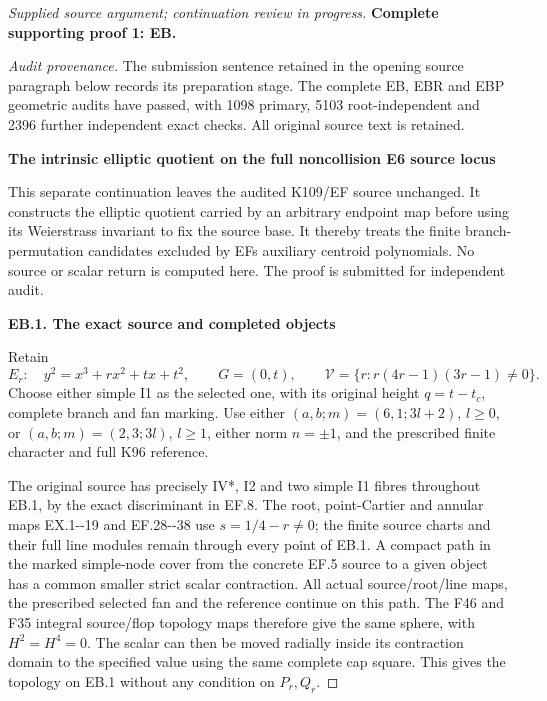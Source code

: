 \begin{proof}[Supplied source argument; continuation review in progress]

\par\bigskip\noindent\textbf{Complete supporting proof 1: EB.}\par


\emph{Audit provenance.} The submission sentence retained in the opening source paragraph below records its preparation stage. The complete EB, EBR and EBP geometric audits have passed, with 1098 primary, 5103 root-independent and 2396 further independent exact checks. All original source text is retained.

\par

\medskip\noindent\textbf{The intrinsic elliptic quotient on the full noncollision E6 source locus}

\par\nobreak

This separate continuation leaves the audited K109/EF source unchanged.
It constructs the elliptic quotient carried by an arbitrary endpoint
map before using its Weierstrass invariant to fix the source base.
It thereby treats the finite branch-permutation candidates excluded
by EF\textquotesingle s auxiliary centroid polynomials. No source or scalar return is
computed here. The proof is submitted for independent audit.

\par

\medskip\noindent\textbf{EB.1. The exact source and completed objects}

\par\nobreak

Retain
\[
 E_r:\quad y^2=x^3+rx^2+tx+t^2,\qquad G=(0,t),\qquad
 \mathcal V=\{r:r(4r-1)(3r-1)\ne0\}.
 \tag{EB.1}
\]
Choose either simple I1 as the selected one, with its original height
\(q=t-t_c\), complete branch and fan marking. Use either
\((a,b;m)=(6,1;3l+2)\), \(l\ge0\), or
\((a,b;m)=(2,3;3l)\), \(l\ge1\), either norm \(n=\pm1\),
and the prescribed finite character and full K96 reference.

The original source has precisely IV*, I2 and two simple I1 fibres
throughout EB.1, by the exact discriminant in EF.8. The root,
point-Cartier and annular maps EX.1-\/-19 and EF.28-\/-38 use
\(s=1/4-r\ne0\); the finite source charts and their full line
modules remain through every point of EB.1. A compact path in the
marked simple-node cover from the concrete EF.5 source to a given
object has a common smaller strict scalar contraction. All actual
source/root/line maps, the prescribed selected fan and the reference
continue on this path. The F46 and F35 integral source/flop topology
maps therefore give the same sphere, with \(H^2=H^4=0\).
The scalar can then be moved radially inside its contraction domain
to the specified value using the same complete cap square. This
gives the topology on EB.1 without any condition on \(P_r,Q_r\).


\end{proof}
